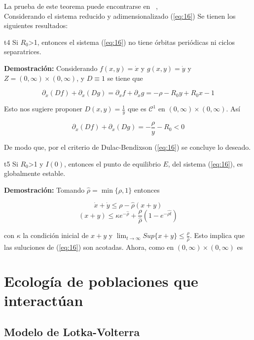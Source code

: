 \documentclass[10pt,oneside]{article}
\theoremstyle{definition}
\begin{document}
\begin{multicols}{2}
    La prueba de este teorema puede encontrarse en ~\cite{dulacben}, \\ \newline Considerando el sistema reducido y adimensionalizado (\ref{eq:16}) Se tienen los siguientes resultados:

    \begin{theorems}{}{t4}
        Si $R_0$>1, entonces el sistema (\ref{eq:16}) no tiene órbitas periódicas ni ciclos separatrices.  
    \end{theorems}

    \textbf{Demostración:} Considerando $f(x,y)=\dot x$ y $g(x,y)=\dot y$ y $Z=(0,\infty)\times(0,\infty)$, y $D\equiv 1$ se tiene que

    $$\partial_x(Df)+\partial_x(Dg)=\partial_xf+\partial_xg=-\rho-R_0y+R_0x-1$$

    Esto nos sugiere proponer $D(x,y)=\displaystyle{\frac{1}{y}}$ que es $\mathcal{C}^{1}$ en $(0,\infty)\times(0,\infty)$. Así

    $$\partial_x(Df)+\partial_x(Dg)=-\frac{\rho}{y}-R_0<0$$

    De modo que, por el criterio de Dulac-Bendixson (\ref{eq:16}) se concluye lo deseado.

    \begin{theorems}{}{t5}
        Si $R_0$>1 y $I(0)$, entonces el punto de equilibrio $E$, del sistema (\ref{eq:16}), es globalmente estable.  
    \end{theorems}

    \textbf{Demostración:} Tomando $\hat{\rho}=\min\{\rho,1\}$ entonces
    
    $$\dot x + \dot y\leq \rho-\hat{\rho}(x+y)$$
    $$(x+y)\leq\kappa e^{-\hat{\rho}}+\frac{\rho}{\hat{\rho}}\left(1-e^{-\hat{\rho t}}\right)$$

    con $\kappa$ la condición inicial de $x+y$ y $\displaystyle{\lim_{t\to \infty} Sup \{x+y\}\leq \frac{\rho}{\hat{\rho}}}$. Esto implica que las suluciones de (\ref{eq:16}) son acotadas. Ahora, como en $(0,\infty)\times(0,\infty)$ es 

    \section{Ecología de poblaciones que interactúan}

    \subsection{Modelo de Lotka-Volterra}


\end{multicols}
\end{document}
